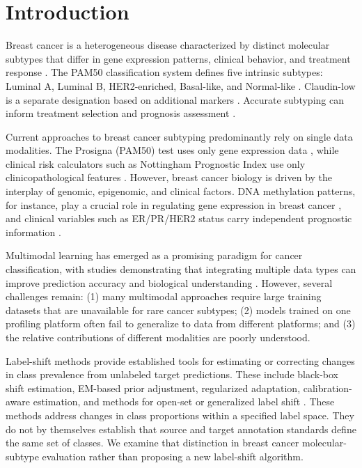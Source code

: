 \documentclass[10pt,journal,compsoc,twocolumn]{IEEEtran}
\begin{document}
\section{Introduction}
Breast cancer is a heterogeneous disease characterized by distinct molecular subtypes that differ in gene expression patterns, clinical behavior, and treatment response \cite{perou2000molecular}. The PAM50 classification system defines five intrinsic subtypes: Luminal A, Luminal B, HER2-enriched, Basal-like, and Normal-like \cite{parker2009supervised}. Claudin-low is a separate designation based on additional markers \cite{prat2010phenotypic}. Accurate subtyping can inform treatment selection and prognosis assessment \cite{prat2014research}.

Current approaches to breast cancer subtyping predominantly rely on single data modalities. The Prosigna (PAM50) test uses only gene expression data \cite{parker2009supervised}, while clinical risk calculators such as Nottingham Prognostic Index use only clinicopathological features \cite{haybittle1982prognostic}. However, breast cancer biology is driven by the interplay of genomic, epigenomic, and clinical factors. DNA methylation patterns, for instance, play a crucial role in regulating gene expression in breast cancer \cite{pasculli2018epigenetics}, and clinical variables such as ER/PR/HER2 status carry independent prognostic information \cite{goldhirsch2013personalizing}.

Multimodal learning has emerged as a promising paradigm for cancer classification, with studies demonstrating that integrating multiple data types can improve prediction accuracy and biological understanding \cite{wang2014similarity, chaudhary2018deep, sharifinoghabi2019moli}. However, several challenges remain: (1) many multimodal approaches require large training datasets that are unavailable for rare cancer subtypes; (2) models trained on one profiling platform often fail to generalize to data from different platforms; and (3) the relative contributions of different modalities are poorly understood.

Label-shift methods provide established tools for estimating or correcting changes in class prevalence from unlabeled target predictions. These include black-box shift estimation, EM-based prior adjustment, regularized adaptation, calibration-aware estimation, and methods for open-set or generalized label shift \cite{lipton2018detecting,azizzadenesheli2019regularized,saerens2002adjusting,alexandari2020maximum,garg2020unified,garg2022open,tachetdescombes2020domain}. These methods address changes in class proportions within a specified label space. They do not by themselves establish that source and target annotation standards define the same set of classes. We examine that distinction in breast cancer molecular-subtype evaluation rather than proposing a new label-shift algorithm.
\end{document}
